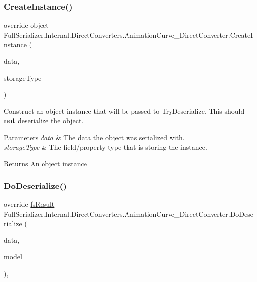 \subsubsection{\texorpdfstring{Create\+Instance()}{CreateInstance()}}
{\footnotesize\ttfamily override object Full\+Serializer.\+Internal.\+Direct\+Converters.\+Animation\+Curve\+\_\+\+Direct\+Converter.\+Create\+Instance (\begin{DoxyParamCaption}\item[{\hyperlink{class_full_serializer_1_1fs_data}{fs\+Data}}]{data,  }\item[{Type}]{storage\+Type }\end{DoxyParamCaption})\hspace{0.3cm}{\ttfamily [inline]}}



Construct an object instance that will be passed to Try\+Deserialize. This should {\bfseries not} deserialize the object. 


\begin{DoxyParams}{Parameters}
{\em data} & The data the object was serialized with.\\
\hline
{\em storage\+Type} & The field/property type that is storing the instance.\\
\hline
\end{DoxyParams}
\begin{DoxyReturn}{Returns}
An object instance
\end{DoxyReturn}
\mbox{\label{class_full_serializer_1_1_internal_1_1_direct_converters_1_1_animation_curve___direct_converter_ae2f2bd51a6e973292469f471a9978962}} 
\subsubsection{\texorpdfstring{Do\+Deserialize()}{DoDeserialize()}}
{\footnotesize\ttfamily override \hyperlink{struct_full_serializer_1_1fs_result}{fs\+Result} Full\+Serializer.\+Internal.\+Direct\+Converters.\+Animation\+Curve\+\_\+\+Direct\+Converter.\+Do\+Deserialize (\begin{DoxyParamCaption}\item[{Dictionary$<$ string, \hyperlink{class_full_serializer_1_1fs_data}{fs\+Data} $>$}]{data,  }\item[{ref Animation\+Curve}]{model }\end{DoxyParamCaption})\hspace{0.3cm}{\ttfamily [inline]}, {\ttfamily [protected]}}



